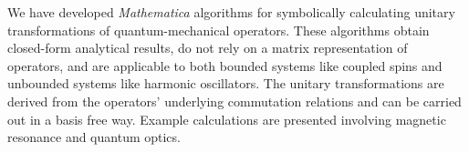 
We have developed \emph{Mathematica} algorithms for symbolically calculating unitary transformations of quantum-mechanical operators.  These algorithms obtain closed-form analytical results, do not rely on a matrix representation of operators, and are applicable to both bounded systems like coupled spins and unbounded systems like harmonic oscillators.  The unitary transformations are derived from the operators' underlying commutation relations and can be carried out in a basis free way.  Example calculations are presented involving magnetic resonance and quantum optics.  